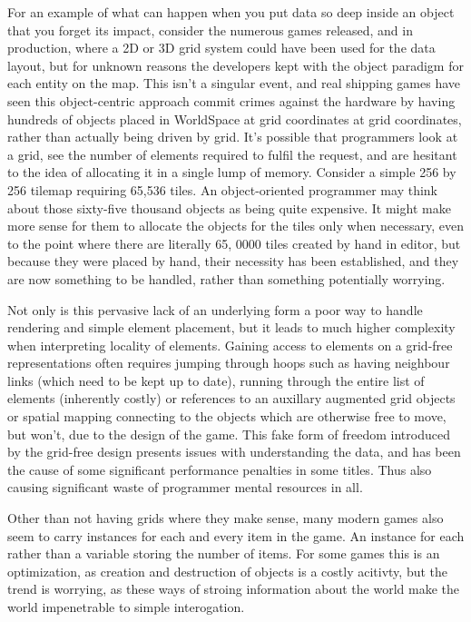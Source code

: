 \documentclass[a4paper,12pt]{book}
\begin{document}
For an example of what can happen when you put data so deep inside an object that you forget its impact, consider the numerous games released, and in production, where a 2D or 3D grid system could have been used for the data layout, but for unknown reasons the developers kept with the object paradigm for each entity on the map.
This isn't a singular event, and real shipping games have seen this object-centric approach commit crimes against the hardware by having hundreds of objects placed in WorldSpace at grid coordinates at grid coordinates, rather than actually being driven by grid.
It's possible that programmers look at a grid, see the number of elements required to fulfil the request, and are hesitant to the idea of allocating it in a single lump of memory.
Consider a simple 256 by 256 tilemap requiring 65,536 tiles.
An object-oriented programmer may think about those sixty-five thousand objects as being quite expensive.
It might make more sense for them to allocate the objects for the tiles only when necessary, even to the point where there are literally 65, 0000 tiles created by hand in editor, but because they were placed by hand, their necessity has been established, and they are now something to be handled, rather than something potentially worrying.

Not only is this pervasive lack of an underlying form a poor way to handle rendering and simple element placement, but it leads to much higher complexity when interpreting locality of elements.
Gaining access to elements on a grid-free representations often requires jumping through hoops such as having neighbour links (which need to be kept up to date), running through the entire list of elements (inherently costly) or references to an auxillary augmented grid objects or spatial mapping connecting to the objects which are otherwise free to move, but won't, due to the design of the game.
This fake form of freedom introduced by the grid-free design presents issues with understanding the data, and has been the cause of some significant performance penalties in some titles.
Thus also causing significant waste of programmer mental resources in all.

Other than not having  grids where they make sense, many modern games also seem to carry instances for each and every item in the game.
An instance for each rather than a variable storing the number of items.
For some games this is an optimization, as creation and destruction of objects is a costly acitivty, but the trend is worrying, as these ways of stroing information about the world make the world impenetrable to simple interogation.
\end{document}
